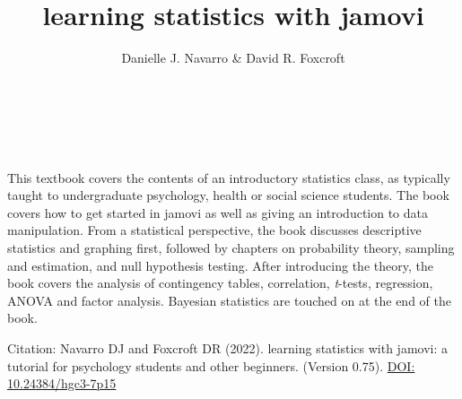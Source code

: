 \documentclass[
  letterpaper,
]{book}
\title{learning statistics with jamovi}
\author{Danielle J. Navarro \& David R. Foxcroft}
\date{}
\let\oldmaketitle\maketitle
\renewcommand*\contentsname{Table of contents}
\newcommand\contentsname{Table of contents}
\begin{document}
\frontmatter
\maketitle
\begin{center}

\end{center}
\let\maketitle\oldmaketitle
\maketitle
\AtBeginShipoutNext{\AtBeginShipoutDiscard}
\mainmatter

\ifdefined\Shaded\renewenvironment{Shaded}{\begin{tcolorbox}[enhanced, sharp corners, frame hidden, boxrule=0pt, breakable, interior hidden, borderline west={3pt}{0pt}{shadecolor}]}{\end{tcolorbox}}\fi

\renewcommand*\contentsname{Table of contents}
{
\hypersetup{linkcolor=}
\setcounter{tocdepth}{2}
\tableofcontents
}
\mainmatter
{}

\hypertarget{section}{%
\chapter*{~}\label{section}}

This textbook covers the contents of an introductory statistics class,
as typically taught to undergraduate psychology, health or social
science students. The book covers how to get started in jamovi as well
as giving an introduction to data manipulation. From a statistical
perspective, the book discusses descriptive statistics and graphing
first, followed by chapters on probability theory, sampling and
estimation, and null hypothesis testing. After introducing the theory,
the book covers the analysis of contingency tables, correlation,
\emph{t}-tests, regression, ANOVA and factor analysis. Bayesian
statistics are touched on at the end of the book.

Citation: Navarro DJ and Foxcroft DR (2022). learning statistics with
jamovi: a tutorial for psychology students and other beginners. (Version
0.75). \href{https://dx.doi.org/10.24384/hgc3-7p15}{DOI:
10.24384/hgc3-7p15}

\end{document}
